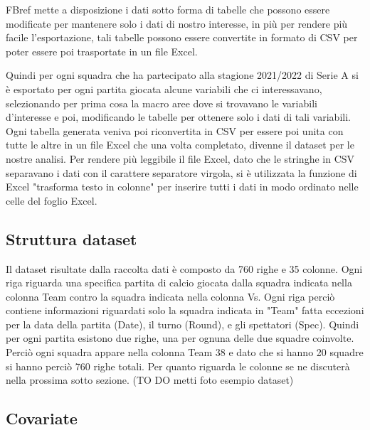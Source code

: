 FBref mette a disposizione i dati sotto forma di tabelle che possono essere modificate per mantenere solo i dati di nostro interesse, in più per rendere più facile l'esportazione, tali tabelle possono essere convertite in formato di CSV per poter essere poi trasportate in un file Excel. 

Quindi per ogni squadra che ha partecipato alla stagione 2021/2022 di Serie A si è esportato per ogni partita giocata alcune variabili che ci interessavano, selezionando per prima cosa la macro aree dove si trovavano le variabili d'interesse e poi, modificando le tabelle per ottenere solo i dati di tali variabili. Ogni tabella generata veniva poi riconvertita in CSV per essere poi unita con tutte le altre in un file Excel che una volta completato, divenne il dataset per le nostre analisi. Per rendere più leggibile il file Excel, dato che le stringhe in CSV separavano i dati con il carattere separatore virgola, si è utilizzata la funzione di Excel "trasforma testo in colonne" per inserire tutti i dati in modo ordinato nelle celle del foglio Excel.

\subsection{Struttura dataset}
Il dataset risultate dalla raccolta dati è composto da 760 righe e 35 colonne. Ogni riga riguarda una specifica partita di calcio giocata dalla squadra indicata nella colonna \textsf{Team} contro la squadra indicata nella colonna \textsf{Vs}. Ogni riga perciò contiene informazioni riguardati solo la squadra indicata in "Team" fatta eccezioni per la data della partita (\textsf{Date}), il turno (\textsf{Round}), e gli spettatori (\textsf{Spec}). Quindi per ogni partita esistono due righe, una per ognuna delle due squadre coinvolte. Perciò ogni squadra appare nella colonna \textsf{Team} 38 e dato che si hanno 20 squadre si hanno perciò 760 righe totali. Per quanto riguarda le colonne se ne discuterà nella prossima sotto sezione. (TO DO metti foto esempio dataset)

\subsection{Covariate}

